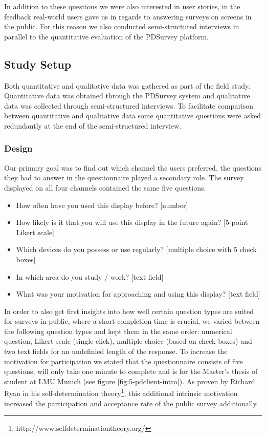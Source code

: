 	In addition to these questions we were also interested in user stories, in the feedback real-world users gave us in regards to answering surveys on screens in the public. For this reason we also conducted semi-structured interviews in parallel to the quantitative evaluation of the PDSurvey platform.




\subsection{Study Setup}

	Both quantitative and qualitative data was gathered as part of the field study. Quantitative data was obtained through the PDSurvey system and qualitative data was collected through semi-structured interviews. To facilitate comparison between quantitative and qualitative data some quantitative questions were asked redundantly at the end of the semi-structured interview.

	\subsubsection{Design}

	Our primary goal was to find out which channel the users preferred, the questions they had to answer in the questionnaire played a secondary role. The survey displayed on all four channels contained the same five questions. 

	\begin{itemize}
	\item How often have you used this display before? [number]
	\item How likely is it that you will use this display in the future again? [5-point Likert scale]
	\item Which devices do you possess or use regularly? [multiple choice with 5 check boxes]
	\item In which area do you study / work? [text field]
	\item What was your motivation for approaching and using this display? [text field]
	\end{itemize}

	In order to also get first insights into how well certain question types are suited for surveys in public, where a short completion time is crucial, we varied between the following question types and kept them in the same order: numerical question, Likert scale (single click), multiple choice (based on check boxes) and two text fields for an undefinied length of the response. To increase the motivation for participation we stated that the questionnaire consists of five questions, will only take one minute to complete and is for the Master's thesis of student at LMU Munich (see figure \ref{fig:5-pdclient-intro}).
	As proven by Richard Ryan in his self-determination theory\cite{ryan2000self}\footnote{http://www.selfdeterminationtheory.org/}, this additional intrinsic motivation increased the participation and acceptance rate of the public survey additionally. 

